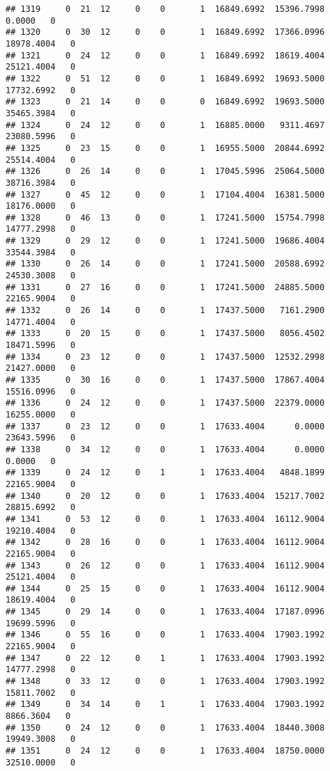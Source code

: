 \documentclass[
]{article}
\begin{document}
\begin{enumerate}
\begin{verbatim}
## 1319     0  21  12     0    0       1  16849.6992  15396.7998      0.0000   0
## 1320     0  30  12     0    0       1  16849.6992  17366.0996  18978.4004   0
## 1321     0  24  12     0    0       1  16849.6992  18619.4004  25121.4004   0
## 1322     0  51  12     0    0       1  16849.6992  19693.5000  17732.6992   0
## 1323     0  21  14     0    0       0  16849.6992  19693.5000  35465.3984   0
## 1324     0  24  12     0    0       1  16885.0000   9311.4697  23080.5996   0
## 1325     0  23  15     0    0       1  16955.5000  20844.6992  25514.4004   0
## 1326     0  26  14     0    0       1  17045.5996  25064.5000  38716.3984   0
## 1327     0  45  12     0    0       1  17104.4004  16381.5000  18176.0000   0
## 1328     0  46  13     0    0       1  17241.5000  15754.7998  14777.2998   0
## 1329     0  29  12     0    0       1  17241.5000  19686.4004  33544.3984   0
## 1330     0  26  14     0    0       1  17241.5000  20588.6992  24530.3008   0
## 1331     0  27  16     0    0       1  17241.5000  24885.5000  22165.9004   0
## 1332     0  26  14     0    0       1  17437.5000   7161.2900  14771.4004   0
## 1333     0  20  15     0    0       1  17437.5000   8056.4502  18471.5996   0
## 1334     0  23  12     0    0       1  17437.5000  12532.2998  21427.0000   0
## 1335     0  30  16     0    0       1  17437.5000  17867.4004  15516.0996   0
## 1336     0  24  12     0    0       1  17437.5000  22379.0000  16255.0000   0
## 1337     0  23  12     0    0       1  17633.4004      0.0000  23643.5996   0
## 1338     0  34  12     0    0       1  17633.4004      0.0000      0.0000   0
## 1339     0  24  12     0    1       1  17633.4004   4848.1899  22165.9004   0
## 1340     0  20  12     0    0       1  17633.4004  15217.7002  28815.6992   0
## 1341     0  53  12     0    0       1  17633.4004  16112.9004  19210.4004   0
## 1342     0  28  16     0    0       1  17633.4004  16112.9004  22165.9004   0
## 1343     0  26  12     0    0       1  17633.4004  16112.9004  25121.4004   0
## 1344     0  25  15     0    0       1  17633.4004  16112.9004  18619.4004   0
## 1345     0  29  14     0    0       1  17633.4004  17187.0996  19699.5996   0
## 1346     0  55  16     0    0       1  17633.4004  17903.1992  22165.9004   0
## 1347     0  22  12     0    1       1  17633.4004  17903.1992  14777.2998   0
## 1348     0  33  12     0    0       1  17633.4004  17903.1992  15811.7002   0
## 1349     0  34  14     0    1       1  17633.4004  17903.1992   8866.3604   0
## 1350     0  24  12     0    0       1  17633.4004  18440.3008  19949.3008   0
## 1351     0  24  12     0    0       1  17633.4004  18750.0000  32510.0000   0

\end{verbatim}
\end{enumerate}
\end{document}
